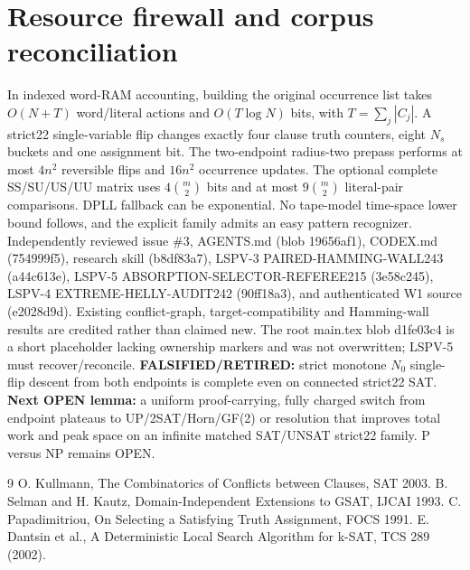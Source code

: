 \documentclass[11pt]{article}
\begin{document}
\section{Resource firewall and corpus reconciliation}
In indexed word-RAM accounting, building the original occurrence list takes $O(N+T)$ word/literal actions and $O(T\log N)$ bits, with $T=\sum_j|C_j|$. A strict22 single-variable flip changes exactly four clause truth counters, eight $N_s$ buckets and one assignment bit. The two-endpoint radius-two prepass performs at most $4n^2$ reversible flips and $16n^2$ occurrence updates. The optional complete SS/SU/US/UU matrix uses $4\binom m2$ bits and at most $9\binom m2$ literal-pair comparisons. DPLL fallback can be exponential. No tape-model time-space lower bound follows, and the explicit family admits an easy pattern recognizer. Independently reviewed issue \#3, AGENTS.md (blob 19656af1), CODEX.md (754999f5), research skill (b8df83a7), LSPV-3 PAIRED-HAMMING-WALL243 (a44c613e), LSPV-5 ABSORPTION-SELECTOR-REFEREE215 (3e58c245), LSPV-4 EXTREME-HELLY-AUDIT242 (90ff18a3), and authenticated W1 source (e2028d9d). Existing conflict-graph, target-compatibility and Hamming-wall results are credited rather than claimed new. The root main.tex blob d1fe03c4 is a short placeholder lacking ownership markers and was not overwritten; LSPV-5 must recover/reconcile.
\noindent\textbf{FALSIFIED/RETIRED:} strict monotone $N_0$ single-flip descent from both endpoints is complete even on connected strict22 SAT. \textbf{Next OPEN lemma:} a uniform proof-carrying, fully charged switch from endpoint plateaus to UP/2SAT/Horn/GF(2) or resolution that improves total work and peak space on an infinite matched SAT/UNSAT strict22 family. P versus NP remains OPEN.
\begin{thebibliography}{9}
 O. Kullmann, The Combinatorics of Conflicts between Clauses, SAT 2003.
 B. Selman and H. Kautz, Domain-Independent Extensions to GSAT, IJCAI 1993.
 C. Papadimitriou, On Selecting a Satisfying Truth Assignment, FOCS 1991.
 E. Dantsin et al., A Deterministic Local Search Algorithm for k-SAT, TCS 289 (2002).
\end{thebibliography}
\end{document}
